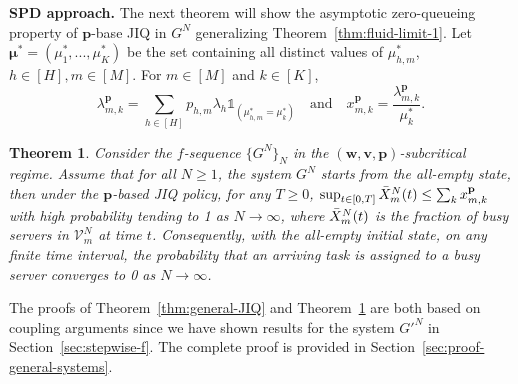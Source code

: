 \documentclass[11pt, reqno]{article}
\newtheorem{theorem}{Theorem}
\numberwithin{equation}{section}
\numberwithin{theorem}{section}
\begin{document}
\noindent
\textbf{SPD approach.}
The next theorem will show the asymptotic zero-queueing property of $\mathbf{p}$-base JIQ in $G^N$ generalizing Theorem~\ref{thm:fluid-limit-1}.
Let $\boldsymbol\mu^*=(\mu^*_1,...,\mu^*_K)$ be the set containing all distinct values of $\mu^*_{h,m}$, $h\in[H], m\in[M]$.
For $m\in[M]$ and $k\in[K]$, 
\begin{equation*}
    \lambda^{\mathbf{p}}_{m,k}=\sum_{h\in[H]}p_{h,m}\lambda_h\mathds{1}_{(\mu^*_{h,m}=\mu^*_k)}\quad 
\text{and}\quad
    x^{\mathbf{p}}_{m,k}=\frac{\lambda^{\mathbf{p}}_{m,k}}{\mu^*_k}.
\end{equation*}
\begin{theorem}%
\label{thm:f-zero-queue}
Consider the $f$-sequence $\{G^N\}_N$ in the $(\mathbf{w},\mathbf{v},\mathbf{p})$-subcritical regime. Assume that for all $N\geq 1$, the system $G^N$ starts from the all-empty state, then under the $\mathbf{p}$-based JIQ policy, for any $T\geq 0$, $\sup_{t\in[0,T]}\Bar{X}^N_m(t)\leq \sum_{k}x^{\mathbf{p}}_{m,k}$ with high probability tending to 1 as $N\rightarrow\infty$, where $\Bar{X}^N_m(t)$ is the fraction of busy servers in $\mathcal{V}^N_m$ at time $t$.
Consequently, with the all-empty initial state, on any finite time interval, the probability that an arriving task is assigned to a busy server converges to 0 as $N\rightarrow\infty$.
\end{theorem}
The proofs of Theorem~\ref{thm:general-JIQ} and Theorem~\ref{thm:f-zero-queue} are both based on coupling arguments since we have shown results for the system $G'^N$ in Section~\ref{sec:stepwise-f}. The complete proof is provided in Section~\ref{sec:proof-general-systems}. 
\end{document}
